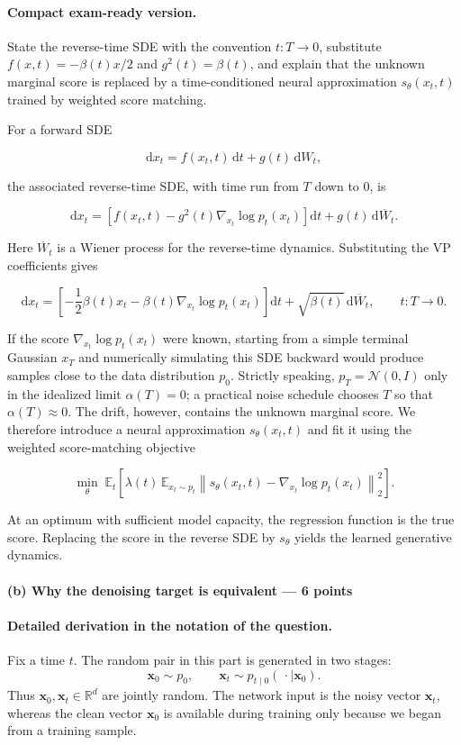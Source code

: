 \documentclass[11pt,a4paper]{article}
\theoremstyle{definition}
\begin{document}
\paragraph{Compact exam-ready version.}
State the reverse-time SDE with the convention $t:T\to 0$, substitute $f(x,t)=-\beta(t)x/2$ and $g^2(t)=\beta(t)$, and explain that the unknown marginal score is replaced by a time-conditioned neural approximation $s_\theta(x_t,t)$ trained by weighted score matching.

For a forward SDE

\[
\mathrm{d}x_t = f(x_t,t)\,\mathrm{d}t+g(t)\,\mathrm{d}W_t,
\]

the associated reverse-time SDE, with time run from $T$ down to $0$, is

\[
\mathrm{d}x_t
= \left[f(x_t,t)-g^2(t)\nabla_{x_t}\log p_t(x_t)\right]\mathrm{d}t
+g(t)\,\mathrm{d}\overline{W}_t.
\]

Here $\overline{W}_t$ is a Wiener process for the reverse-time dynamics. Substituting the VP coefficients gives

\[
\mathrm{d}x_t
= \left[-\frac12\beta(t)x_t-\beta(t)\nabla_{x_t}\log p_t(x_t)\right]\mathrm{d}t
+\sqrt{\beta(t)}\,\mathrm{d}\overline{W}_t,
\qquad t:T\to 0.
\]

If the score $\nabla_{x_t}\log p_t(x_t)$ were known, starting from a simple terminal Gaussian $x_T$ and numerically simulating this SDE backward would produce samples close to the data distribution $p_0$. Strictly speaking, $p_T=\mathcal{N}(0,I)$ only in the idealized limit $\alpha(T)=0$; a practical noise schedule chooses $T$ so that $\alpha(T)\approx 0$. The drift, however, contains the unknown marginal score. We therefore introduce a neural approximation $s_\theta(x_t,t)$ and fit it using the weighted score-matching objective

\[
\min_\theta\;
\mathbb{E}_t\left[
\lambda(t)\,
\mathbb{E}_{x_t\sim p_t}
\left\|s_\theta(x_t,t)-\nabla_{x_t}\log p_t(x_t)\right\|_2^2
\right].
\]

At an optimum with sufficient model capacity, the regression function is the true score. Replacing the score in the reverse SDE by $s_\theta$ yields the learned generative dynamics.

\paragraph{(b) Why the denoising target is equivalent --- 6 points}

\paragraph{Detailed derivation in the notation of the question.}
Fix a time $t$. The random pair in this part is generated in two stages:
\[
\mathbf{x}_0\sim p_0,
\qquad
\mathbf{x}_t\sim p_{t\mid 0}(\,\cdot\mid\mathbf{x}_0).
\]
Thus $\mathbf{x}_0,\mathbf{x}_t\in\mathbb{R}^d$ are jointly random. The network input is
the noisy vector $\mathbf{x}_t$, whereas the clean vector $\mathbf{x}_0$ is available
during training only because we began from a training sample.
\end{document}
